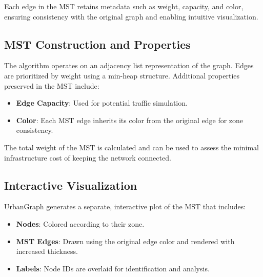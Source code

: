 \documentclass[12pt]{article}
\begin{document}
Each edge in the MST retains metadata such as weight, capacity, and color, ensuring consistency with the original graph and enabling intuitive visualization.

\subsection*{MST Construction and Properties}

The algorithm operates on an adjacency list representation of the graph. Edges are prioritized by weight using a min-heap structure. Additional properties preserved in the MST include:
\begin{itemize}
    \item \textbf{Edge Capacity}: Used for potential traffic simulation.
    \item \textbf{Color}: Each MST edge inherits its color from the original edge for zone consistency.
\end{itemize}

The total weight of the MST is calculated and can be used to assess the minimal infrastructure cost of keeping the network connected.


\subsection*{Interactive Visualization}

UrbanGraph generates a separate, interactive plot of the MST that includes:
\begin{itemize}
    \item \textbf{Nodes}: Colored according to their zone.
    \item \textbf{MST Edges}: Drawn using the original edge color and rendered with increased thickness.
    \item \textbf{Labels}: Node IDs are overlaid for identification and analysis.
\end{itemize}
\end{document}
